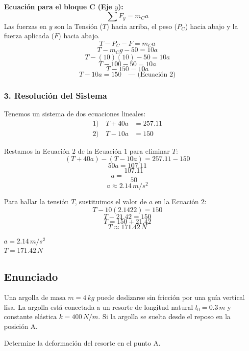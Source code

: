 \documentclass[12pt, a4paper]{article}
\begin{document}
\textbf{Ecuación para el bloque C (Eje $y$):}
$$ \sum F_y = m_C a $$
Las fuerzas en $y$ son la Tensión ($T$) hacia arriba, el peso ($P_C$) hacia abajo y la fuerza aplicada ($F$) hacia abajo.
$$ T - P_C - F = m_C a $$
$$ T - m_C g - 50 = 10 a $$
$$ T - (10)(10) - 50 = 10 a $$
$$ T - 100 - 50 = 10 a $$
$$ T - 150 = 10 a $$
$$ T - 10 a = 150 \quad \text{--- (Ecuación 2)} $$

\subsubsection*{3. Resolución del Sistema}
Tenemos un sistema de dos ecuaciones lineales:
\begin{align*}
    1) \quad T + 40a &= 257.11 \\
    2) \quad T - 10a &= 150
\end{align*}

Restamos la Ecuación 2 de la Ecuación 1 para eliminar $T$:
$$ (T + 40a) - (T - 10a) = 257.11 - 150 $$
$$ 50 a = 107.11 $$
$$ a = \frac{107.11}{50} $$
$$ a \approx 2.14 \, \si{m/s^2} $$

Para hallar la tensión $T$, sustituimos el valor de $a$ en la Ecuación 2:
$$ T - 10(2.1422) = 150 $$
$$ T - 21.42 = 150 $$
$$ T = 150 + 21.42 $$
$$ T \approx 171.42 \, \si{N} $$

\begin{tcolorbox}[colback=green!5!white, colframe=green!50!black, title=Respuesta Final]
\centering 
$a = 2.14 \, \si{m/s^2}$ \\
$T = 171.42 \, \si{N}$
\end{tcolorbox}

\newpage

\subsection*{Enunciado}
Una argolla de masa $m = 4 \, \si{kg}$ puede deslizarse sin fricción por una guía vertical lisa. La argolla está conectada a un resorte de longitud natural $l_0 = 0.3 \, \si{m}$ y constante elástica $k = 400 \, \si{N/m}$. Si la argolla se suelta desde el reposo en la posición A. 

Determine la deformación del resorte en el punto A.
\end{document}
